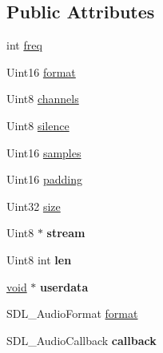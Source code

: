 \subsection*{Public Attributes}
\begin{DoxyCompactItemize}
\item 
int \hyperlink{structSDL__AudioSpec_a8b823ce46fc2e448cf7e6fc141aff6b2}{freq}
\item 
Uint16 \hyperlink{structSDL__AudioSpec_ae37c634cac5807762f184c8d5d49fc2d}{format}
\item 
Uint8 \hyperlink{structSDL__AudioSpec_a31fe8b3710cf23bbef24be8a1749fe46}{channels}
\item 
Uint8 \hyperlink{structSDL__AudioSpec_addc462c8a806e6c122eccf63482048f6}{silence}
\item 
Uint16 \hyperlink{structSDL__AudioSpec_a2cdf5e885808c10bfa2810b706e69f95}{samples}
\item 
Uint16 \hyperlink{structSDL__AudioSpec_a738371fc13b54cefef4db16994abeeb6}{padding}
\item 
Uint32 \hyperlink{structSDL__AudioSpec_a154cf44743ecec78c36dc6c827dd2fdb}{size}
\item 
\hypertarget{structSDL__AudioSpec_aacbebdd2696a8abec7ac5bed473eb5c5}{Uint8 $\ast$ {\bfseries stream}}\label{structSDL__AudioSpec_aacbebdd2696a8abec7ac5bed473eb5c5}

\item 
\hypertarget{structSDL__AudioSpec_ab6f999b1bf0ee080b42f4f6a5f59ee47}{Uint8 int {\bfseries len}}\label{structSDL__AudioSpec_ab6f999b1bf0ee080b42f4f6a5f59ee47}

\item 
\hypertarget{structSDL__AudioSpec_ae3fdaf1ab3c3eb6878979d670dbcc774}{\hyperlink{structSDL__AudioSpec_ab8a359069a60f225ab6e35a55dfb3d92}{void} $\ast$ {\bfseries userdata}}\label{structSDL__AudioSpec_ae3fdaf1ab3c3eb6878979d670dbcc774}

\item 
S\+D\+L\+\_\+\+Audio\+Format \hyperlink{structSDL__AudioSpec_ae37c634cac5807762f184c8d5d49fc2d}{format}
\item 
\hypertarget{structSDL__AudioSpec_a1f8d05139f1679dcf359f49251233eac}{S\+D\+L\+\_\+\+Audio\+Callback {\bfseries callback}}\label{structSDL__AudioSpec_a1f8d05139f1679dcf359f49251233eac}

\end{DoxyCompactItemize}


